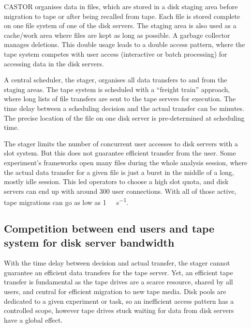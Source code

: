 \documentclass[a4paper]{jpconf}
\begin{document}
CASTOR organises data in files, which are stored in a disk staging area before migration to tape or after being recalled from tape. Each file is stored complete on one file system of one of the disk servers. The staging area is also used as a cache/work area where files are kept as long as possible. A garbage collector manages deletions. This double usage leads to a double access pattern, where the tape system competes with user access (interactive or batch processing) for accessing data in the disk servers.

A central scheduler, the stager, organises all data transfers to and from the staging areas. The tape system is scheduled with a ``freight train'' approach, where long lists of file transfers are sent to the tape servers for execution. The time delay between a scheduling decision and the actual transfer can be minutes. The precise location of the file on one disk server is pre-determined at scheduling time.

The stager limits the number of concurrent user accesses to disk servers with a slot system. But this does not guarantee efficient transfer from the user. Some experiment's frameworks open many files during the whole analysis session, where the actual data transfer for a given file is just a burst in the middle of a long, mostly idle session. This led operators to choose a high slot quota, and disk servers can end up with around 300 user connections. With all of those active, tape migrations can go as low as \SI[per-mode=symbol]{1}{\mega\byte\per\second}.

\subsection{Competition between end users and tape system for disk server bandwidth}

With the time delay between decision and actual transfer, the stager cannot guarantee an efficient data transfers for the tape server. Yet, an efficient tape transfer is fundamental as the tape drives are a scarce resource, shared by all users, and central for efficient migration to new tape media\cite{repack}. Disk pools are dedicated to a given experiment or task, so an inefficient access pattern has a controlled scope, however tape drives stuck waiting for data from disk servers have a global effect.

\end{document}
